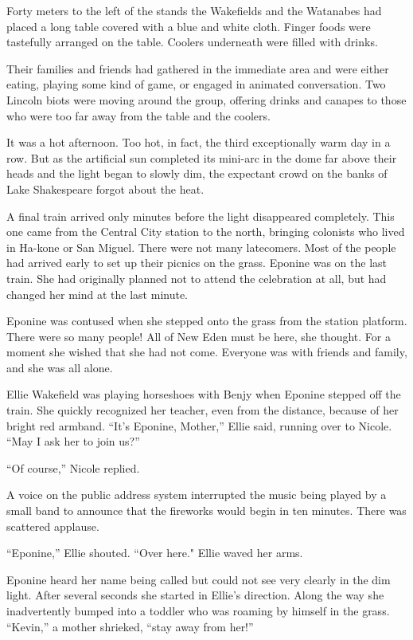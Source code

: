 \documentclass[]{article}
\begin{document}
{Forty meters to the left of the stands the Wakefields and the Watanabes had placed a long table covered with a blue and white cloth.  Finger foods were tastefully arranged on the table.  Coolers underneath were filled with drinks.

Their families and friends had gathered in the immediate area and were either eating, playing some kind of game, or engaged in animated conversation.  Two Lincoln biots were moving around the group, offering drinks and canapes to those who were too far away from the table and the coolers.

It was a hot afternoon.  Too hot, in fact, the third exceptionally warm day in a row.  But as the artificial sun completed its mini-arc in the dome far above their heads and the light began to slowly dim, the expectant crowd on the banks of Lake Shakespeare forgot about the heat.

A final train arrived only minutes before the light disappeared completely.  This one came from the Central City station to the north, bringing colonists who lived in Ha-kone or San Miguel.  There were not many latecomers.  Most of the people had arrived early to set up their picnics on the grass.  Eponine was on the last train.  She had originally planned not to attend the celebration at all, but had changed her mind at the last minute.

Eponine was contused when she stepped onto the grass from the station platform.  There were so many people! All of New Eden must be here, she thought.  For a moment she wished that she had not come.  Everyone was with friends and family, and she was all alone.

Ellie Wakefield was playing horseshoes with Benjy when Eponine stepped off the train.  She quickly recognized her teacher, even from the distance, because of her bright red armband.  “It’s Eponine, Mother,” Ellie said, running over to Nicole.  “May I ask her to join us?”

“Of course,” Nicole replied.

A voice on the public address system interrupted the music being played by a small band to announce that the fireworks would begin in ten minutes.  There was scattered applause.

“Eponine,” Ellie shouted.  “Over here."  Ellie waved her arms.

Eponine heard her name being called but could not see very clearly in the dim light.  After several seconds she started in Ellie’s direction.  Along the way she inadvertently bumped into a toddler who was roaming by himself in the grass.  “Kevin,” a mother shrieked, “stay away from her!”

}
\end{document}
